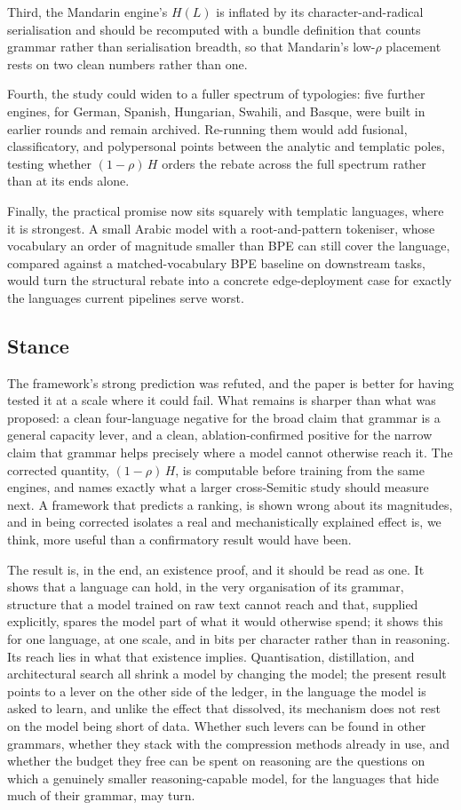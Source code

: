 Third, the Mandarin engine's $H(L)$ is inflated by its character-and-radical serialisation and should be recomputed with a bundle definition that counts grammar rather than serialisation breadth, so that Mandarin's low-$\rho$ placement rests on two clean numbers rather than one.

Fourth, the study could widen to a fuller spectrum of typologies: five further engines, for German, Spanish, Hungarian, Swahili, and Basque, were built in earlier rounds and remain archived. Re-running them would add fusional, classificatory, and polypersonal points between the analytic and templatic poles, testing whether $(1-\rho)\,H$ orders the rebate across the full spectrum rather than at its ends alone.

Finally, the practical promise now sits squarely with templatic languages, where it is strongest. A small Arabic model with a root-and-pattern tokeniser, whose vocabulary an order of magnitude smaller than BPE can still cover the language, compared against a matched-vocabulary BPE baseline on downstream tasks, would turn the structural rebate into a concrete edge-deployment case for exactly the languages current pipelines serve worst.

\subsection{Stance}
\label{sec:conclusion-stance}

The framework's strong prediction was refuted, and the paper is better for having tested it at a scale where it could fail. What remains is sharper than what was proposed: a clean four-language negative for the broad claim that grammar is a general capacity lever, and a clean, ablation-confirmed positive for the narrow claim that grammar helps precisely where a model cannot otherwise reach it. The corrected quantity, $(1-\rho)\,H$, is computable before training from the same engines, and names exactly what a larger cross-Semitic study should measure next. A framework that predicts a ranking, is shown wrong about its magnitudes, and in being corrected isolates a real and mechanistically explained effect is, we think, more useful than a confirmatory result would have been.

The result is, in the end, an existence proof, and it should be read as one. It shows that a language can hold, in the very organisation of its grammar, structure that a model trained on raw text cannot reach and that, supplied explicitly, spares the model part of what it would otherwise spend; it shows this for one language, at one scale, and in bits per character rather than in reasoning. Its reach lies in what that existence implies. Quantisation, distillation, and architectural search all shrink a model by changing the model; the present result points to a lever on the other side of the ledger, in the language the model is asked to learn, and unlike the effect that dissolved, its mechanism does not rest on the model being short of data. Whether such levers can be found in other grammars, whether they stack with the compression methods already in use, and whether the budget they free can be spent on reasoning are the questions on which a genuinely smaller reasoning-capable model, for the languages that hide much of their grammar, may turn.
